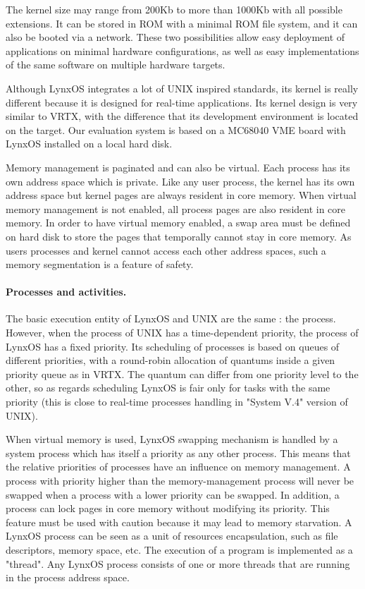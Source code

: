 \documentclass[10pt]{report}
\begin{document}
The kernel size may range from 200Kb to more than 1000Kb with all 
possible extensions. It can be stored in ROM with a minimal ROM 
file system, and it can also be booted via a network. These two 
possibilities allow easy deployment of applications on minimal 
hardware configurations, as well as easy implementations of the 
same software on multiple hardware targets.

Although LynxOS integrates a lot of UNIX inspired standards, its 
kernel is really different because it is designed for real-time 
applications. Its kernel design is very similar to VRTX, with the 
difference that its development environment is located on the 
target. Our evaluation system is based on a MC68040 VME board 
with LynxOS installed on a local hard disk.

Memory management is paginated and can also be virtual. Each 
process has its own address space which is private. Like any user 
process, the kernel has its own address space but kernel pages 
are always resident in core memory. When virtual memory 
management is not enabled, all process pages are also resident in 
core memory. In order to have virtual memory enabled, a swap area 
must be defined on hard disk to store the pages that temporally 
cannot stay in core memory. As users processes and kernel cannot 
access each other address spaces, such a memory segmentation is a 
feature of safety.


\paragraph{Processes and activities.} The basic execution entity of LynxOS and UNIX are the same : the process. However, when 
the process of UNIX has a time-dependent priority, the process of LynxOS has a fixed priority. Its scheduling of processes is 
based on queues of different priorities, with a round-robin allocation of quantums inside a given priority queue as in VRTX. 
The quantum can differ from one priority level to the other, so as regards scheduling LynxOS is fair only for tasks with the same 
priority (this is close to real-time processes handling in "System V.4" version of UNIX).

When virtual memory is used, LynxOS swapping mechanism is handled by a system process which has itself a priority
as any other process. This means that the relative priorities of processes have an influence on memory management. A process with 
priority higher than the memory-management process will never be swapped when a process with a lower priority can be swapped. 
In addition, a process can lock pages in core memory without modifying its priority. This feature must be used with
caution because it may lead to memory starvation. A LynxOS process can be seen as a unit of resources encapsulation, such
as file descriptors, memory space, etc. The execution of a program is implemented as a "thread". Any LynxOS process consists of 
one or more threads that are running in the process address space.
\end{document}
